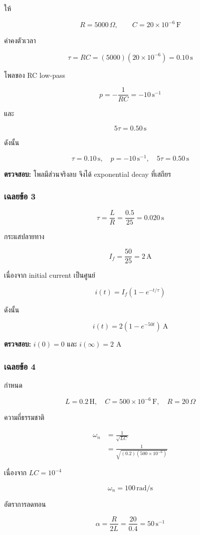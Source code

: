 ให้

\[
R=5000\,\Omega,\qquad C=20\times10^{-6}\,\text{F}
\]

ค่าคงตัวเวลา

\[
\tau=RC=(5000)(20\times10^{-6})=0.10\,\text{s}
\]

โพลของ RC low-pass

\[
p=-\frac{1}{RC}=-10\,\text{s}^{-1}
\]

และ

\[
5\tau=0.50\,\text{s}
\]

ดังนั้น

\[
\boxed{\tau=0.10\,\text{s},\quad p=-10\,\text{s}^{-1},\quad5\tau=0.50\,\text{s}}
\]

\textbf{ตรวจสอบ:} โพลมีส่วนจริงลบ จึงได้ exponential decay ที่เสถียร

\subsubsection{เฉลยข้อ 3}

\[
\tau=\frac{L}{R}=\frac{0.5}{25}=0.020\,\text{s}
\]

กระแสปลายทาง

\[
I_f=\frac{50}{25}=2\,\text{A}
\]

เนื่องจาก initial current เป็นศูนย์

\[
i(t)=I_f(1-e^{-t/\tau})
\]

ดังนั้น

\[
\boxed{i(t)=2(1-e^{-50t})\ \text{A}}
\]

\textbf{ตรวจสอบ:} $i(0)=0$ และ $i(\infty)=2$ A

\subsubsection{เฉลยข้อ 4}

กำหนด

\[
L=0.2\,\text{H},\quad C=500\times10^{-6}\,\text{F},\quad R=20\,\Omega
\]

ความถี่ธรรมชาติ

\[
\begin{aligned}
    \omega_n&=\frac{1}{\sqrt{LC}} \\
    &=\frac{1}{\sqrt{(0.2)(500\times10^{-6})}}
\end{aligned}
\]

เนื่องจาก $LC=10^{-4}$

\[
\boxed{\omega_n=100\,\text{rad/s}}
\]

อัตราการลดทอน

\[
\alpha=\frac{R}{2L}=\frac{20}{0.4}=50\,\text{s}^{-1}
\]

